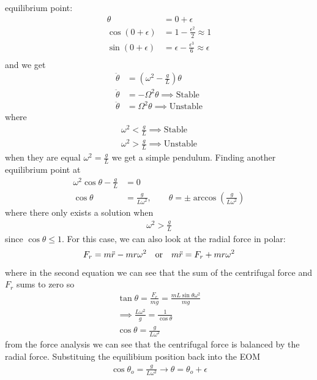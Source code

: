 \documentclass[../main.tex]{subfiles}
\begin{document}
equilibrium point:
\begin{align*}
    \theta &= 0 + \epsilon \\
    \cos(0 + \epsilon) &= 1 - \frac{\epsilon^2}{2} \approx 1 \\
    \sin(0 + \epsilon) &= \epsilon - \frac{\epsilon^3}{6} \approx \epsilon \\
\end{align*}
and we get
\begin{align*}
    \ddot \theta &= (\omega^2 - \frac{g}{L}) \theta \\
    \ddot \theta &= - \Omega^2 \theta \implies \mathrm{Stable} \\
    \ddot \theta &= \Omega^2 \theta \implies \mathrm{Unstable}
\end{align*}
where 
\begin{align*}
    \omega^2 < \frac{g}{L} \implies \mathrm{Stable} \\
    \omega^2 > \frac{g}{L} \implies \mathrm{Unstable}
\end{align*}
when they are equal $\omega^2 = \frac{g}{L}$ we get a simple pendulum. Finding another equilibrium
point at
\begin{align*}
    \omega^2 \cos\theta - \frac{g}{L} &= 0 \\
    \cos\theta &= \frac{g}{L\omega^2}, \qquad \theta = \pm \arccos(\frac{g}{L\omega^2})
\end{align*}
where there only exists a solution when
\begin{align*}
    \omega^2 > \frac{g}{L}
\end{align*}
since $\cos\theta \leq 1$. For this case, we can also look at the radial force in polar:
\begin{align*}
    F_r = m\ddot r - mr \omega^2
    \qor m\ddot r = F_r + mr \omega^2
\end{align*}
where in the second equation we can see that the sum of the centrifugal force and $F_r$ sums to zero
so
\begin{align*}
    \tan \theta = \frac{F_r}{mg} = \frac{mL \sin\theta\omega^2}{mg} \\
    \implies \frac{L\omega^2}{g} = \frac{1}{\cos\theta} \\
    \cos\theta = \frac{g}{L\omega^2}
\end{align*}
from the force analysis we can see that the centrifugal force is balanced by the radial force.
Substituing the equilibium position back into the EOM 
\begin{align*}
    \cos\theta_o = \frac{g}{L\omega^2} \to \theta = \theta_o + \epsilon
\end{align*}
\end{document}
